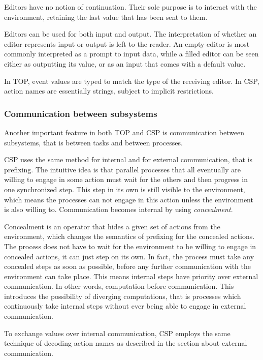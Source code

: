 Editors have no notion of continuation.
Their sole purpose is to interact with the environment, retaining the last value that has been sent to them.

Editors can be used for both input and output.
The interpretation of whether an editor represents input or output is left to the reader.
An empty editor is most commonly interpreted as a prompt to input data, while a filled editor can be seen either as outputting its value, or as an input that comes with a default value.

In TOP, event values are typed to match the type of the receiving editor.
In CSP, action names are essentially strings, subject to implicit restrictions.


\subsubsection{Communication between subsystems}

Another important feature in both TOP and CSP is communication between subsystems, that is between tasks and between processes.

CSP uses the same method for internal and for external communication, that is prefixing.
The intuitive idea is that parallel processes that all eventually are willing to engage in some action must wait for the others and then progress in one synchronized step.
This step in its own is still visible to the environment, which means the processes can not engage in this action unless the environment is also willing to.
Communication becomes internal by using \emph{concealment}.

Concealment is an operator that hides a given set of actions from the environment, which changes the semantics of prefixing for the concealed actions.
The process does not have to wait for the environment to be willing to engage in concealed actions, it can just step on its own.
In fact, the process must take any concealed steps as soon as possible, before any further communication with the environment can take place.
This means internal steps have priority over external communication.
In other words, computation before communication.
This introduces the possibility of diverging computations, that is processes which continuously take internal steps without ever being able to engage in external communication.

To exchange values over internal communication, CSP employs the same technique of decoding action names as described in the section about external communication.

